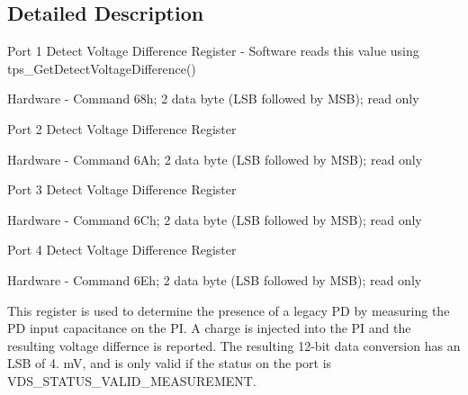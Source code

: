 \subsection{Detailed Description}
Port 1 Detect Voltage Difference Register -\/ Software reads this value using tps\-\_\-\-Get\-Detect\-Voltage\-Difference() \par
 Hardware -\/ Command 68h; 2 data byte (L\-S\-B followed by M\-S\-B); read only \par
 Port 2 Detect Voltage Difference Register \par
 Hardware -\/ Command 6\-Ah; 2 data byte (L\-S\-B followed by M\-S\-B); read only \par
 Port 3 Detect Voltage Difference Register \par
 Hardware -\/ Command 6\-Ch; 2 data byte (L\-S\-B followed by M\-S\-B); read only \par
 Port 4 Detect Voltage Difference Register \par
 Hardware -\/ Command 6\-Eh; 2 data byte (L\-S\-B followed by M\-S\-B); read only \par
\par
 This register is used to determine the presence of a legacy P\-D by measuring the P\-D input capacitance on the P\-I. A charge is injected into the P\-I and the resulting voltage differnce is reported. The resulting 12-\/bit data conversion has an L\-S\-B of 4. m\-V, and is only valid if the status on the port is V\-D\-S\-\_\-\-S\-T\-A\-T\-U\-S\-\_\-\-V\-A\-L\-I\-D\-\_\-\-M\-E\-A\-S\-U\-R\-E\-M\-E\-N\-T. 

